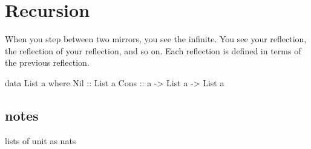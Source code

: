 \documentclass[DaoFP]{subfiles}
\begin{document}
\setcounter{chapter}{6}

\chapter{Recursion}

When you step between two mirrors, you see the infinite. You see your reflection, the reflection of your reflection, and so on. Each reflection is defined in terms of the previous reflection.

\begin{haskell}
data List a where
  Nil :: List a
  Cons :: a -> List a -> List a
\end{haskell}


\section{notes}

lists of unit as nats

\begin{exercise}
\end{exercise}
\begin{haskell}
\end{haskell}
\end{document}
